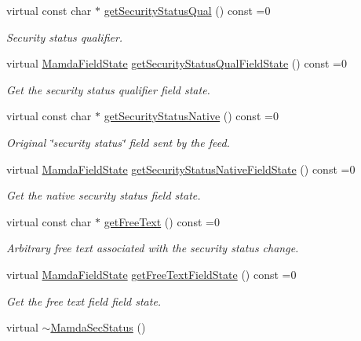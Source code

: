 \begin{CompactItemize}
virtual const char $\ast$ \hyperlink{classWombat_1_1MamdaSecStatus_c75f88870e36e581ef460d88c0fa4719}{get\-Security\-Status\-Qual} () const =0
\begin{CompactList}\small\item\em Security status qualifier. \item\end{CompactList}\item 
virtual \hyperlink{namespaceWombat_93aac974f2ab713554fd12a1fa3b7d2a}{Mamda\-Field\-State} \hyperlink{classWombat_1_1MamdaSecStatus_2552980479d78154cf754c3bcf4647c3}{get\-Security\-Status\-Qual\-Field\-State} () const =0
\begin{CompactList}\small\item\em Get the security status qualifier field state. \item\end{CompactList}\item 
virtual const char $\ast$ \hyperlink{classWombat_1_1MamdaSecStatus_db270a035cf0896af0326704b5799689}{get\-Security\-Status\-Native} () const =0
\begin{CompactList}\small\item\em Original \char`\"{}security status\char`\"{} field sent by the feed. \item\end{CompactList}\item 
virtual \hyperlink{namespaceWombat_93aac974f2ab713554fd12a1fa3b7d2a}{Mamda\-Field\-State} \hyperlink{classWombat_1_1MamdaSecStatus_e12cf50355eda32ff167910636c5629f}{get\-Security\-Status\-Native\-Field\-State} () const =0
\begin{CompactList}\small\item\em Get the native security status field state. \item\end{CompactList}\item 
virtual const char $\ast$ \hyperlink{classWombat_1_1MamdaSecStatus_df2540961aed13114c3799839d59d975}{get\-Free\-Text} () const =0
\begin{CompactList}\small\item\em Arbitrary free text associated with the security status change. \item\end{CompactList}\item 
virtual \hyperlink{namespaceWombat_93aac974f2ab713554fd12a1fa3b7d2a}{Mamda\-Field\-State} \hyperlink{classWombat_1_1MamdaSecStatus_f54b5d795c53c279499fc3fca9748622}{get\-Free\-Text\-Field\-State} () const =0
\begin{CompactList}\small\item\em Get the free text field field state. \item\end{CompactList}\item 
virtual \hyperlink{classWombat_1_1MamdaSecStatus_3f313250bbdadba09d0d963349e40bb8}{$\sim$Mamda\-Sec\-Status} ()
\end{CompactItemize}


